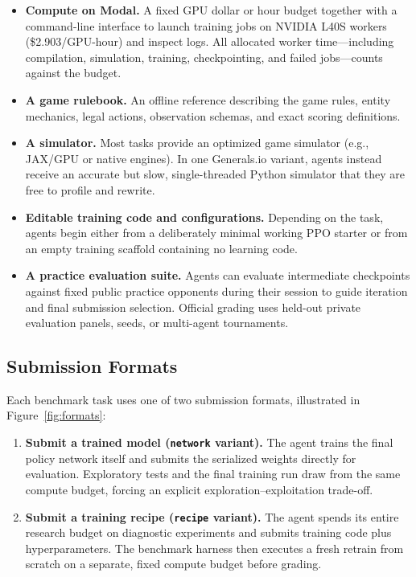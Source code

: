 \documentclass[11pt,letterpaper]{article}
\begin{document}
\begin{itemize}
  \item \textbf{Compute on Modal.} A fixed GPU dollar or hour budget together with a command-line interface to launch training jobs on NVIDIA L40S workers (\$2.903/GPU-hour) and inspect logs. All allocated worker time---including compilation, simulation, training, checkpointing, and failed jobs---counts against the budget.
  \item \textbf{A game rulebook.} An offline reference describing the game rules, entity mechanics, legal actions, observation schemas, and exact scoring definitions.
  \item \textbf{A simulator.} Most tasks provide an optimized game simulator (e.g., JAX/GPU or native engines). In one Generals.io variant, agents instead receive an accurate but slow, single-threaded Python simulator that they are free to profile and rewrite.
  \item \textbf{Editable training code and configurations.} Depending on the task, agents begin either from a deliberately minimal working PPO starter or from an empty training scaffold containing no learning code.
  \item \textbf{A practice evaluation suite.} Agents can evaluate intermediate checkpoints against fixed public practice opponents during their session to guide iteration and final submission selection. Official grading uses held-out private evaluation panels, seeds, or multi-agent tournaments.
\end{itemize}

\subsection{Submission Formats}

Each benchmark task uses one of two submission formats, illustrated in Figure~\ref{fig:formats}:
\begin{enumerate}[leftmargin=1.5em,itemsep=2pt]
  \item \textbf{Submit a trained model (\texttt{network} variant).} The agent trains the final policy network itself and submits the serialized weights directly for evaluation. Exploratory tests and the final training run draw from the same compute budget, forcing an explicit exploration--exploitation trade-off.
  \item \textbf{Submit a training recipe (\texttt{recipe} variant).} The agent spends its entire research budget on diagnostic experiments and submits training code plus hyperparameters. The benchmark harness then executes a fresh retrain from scratch on a separate, fixed compute budget before grading.
\end{enumerate}
\end{document}
